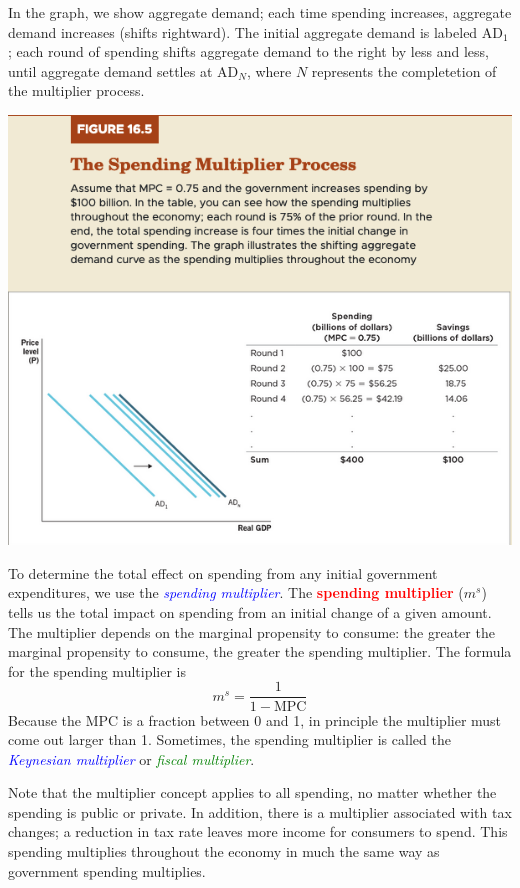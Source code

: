 \documentclass[11pt]{article} %
\begin{document}
In the graph, we show aggregate demand; each time spending increases, aggregate demand increases (shifts rightward). The initial aggregate demand is labeled $\text{AD}_1$; each round of spending shifts aggregate demand to the right by less and less, until aggregate demand settles at $\text{AD}_N$, where $N$ represents the completetion of the multiplier process.

\begin{center}
\includegraphics[scale=0.5]{images/Figure 16.5.png} 
\end{center}

To determine the total effect on spending from any initial government expenditures, we use the \textit{\textcolor{blue}{spending multiplier}}. The \textbf{\textcolor{red}{spending multiplier}} ($m^s$) tells us the total impact on spending from an initial change of a given amount. The multiplier depends on the marginal propensity to consume: the greater the marginal propensity to consume, the greater the spending multiplier. The formula for the spending multiplier is
\begin{equation}
m^s=\frac{1}{1-\text{MPC}}
\end{equation}
Because the MPC is a fraction between 0 and 1, in principle the multiplier must come out larger than 1. Sometimes, the spending multiplier is called the \textit{\textcolor{blue}{Keynesian multiplier}} or \textit{\textcolor{green}{fiscal multiplier}}.

Note that the multiplier concept applies to all spending, no matter whether the spending is public or private. In addition, there is a multiplier associated with tax changes; a reduction in tax rate leaves more income for consumers to spend. This spending multiplies throughout the economy in much the same way as government spending multiplies.
\end{document}
